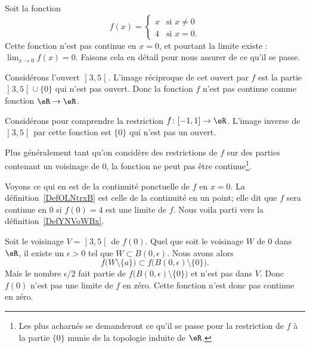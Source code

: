 \begin{example}     \label{EXooKREUooLeuIlv}
    Soit la fonction
    \begin{equation}        \label{EQooSYSWooSGsUfR}
        f(x)=\begin{cases}
            x    &   \text{si } x\neq 0\\
            4    &    \text{si } x=0.
        \end{cases}
    \end{equation}
    Cette fonction n'est pas continue en \( x=0\), et pourtant la limite existe : \( \lim_{x\to 0} f(x)=0\). Faisons cela en détail pour nous assurer de ce qu'il se passe.

    Considérons l'ouvert \( \mathopen] 3 , 5 \mathclose[\). L'image réciproque de cet ouvert par \( f\) est la partie \( \mathopen] 3 , 5 \mathclose[\cup\{ 0 \}\) qui n'est pas ouvert. Donc la fonction \( f\) n'est pas continue comme fonction \( \eR\to \eR\).

    Considérons pour comprendre la restriction \( f\colon \mathopen[ -1 , 1 \mathclose]\to \eR\). L'image inverse de \( \mathopen] 3 , 5 \mathclose[\) par cette fonction est \( \{ 0 \}\) qui n'est pas un ouvert.

    Plus généralement tant qu'on considère des restrictions de \( f\) sur des parties contenant un voisinage de \( 0\), la fonction ne peut pas être continue\footnote{Les plus acharnés se demanderont ce qu'il se passe pour la restriction de \( f\) à la partie \( \{ 0 \}\) munie de la topologie induite de $\eR$.}.

    Voyons ce qui en est de la continuité ponctuelle de \( f\) en \( x=0\). La définition~\ref{DefOLNtrxB} est celle de la continuité en un point; elle dit que \( f\) sera continue en \( 0\) si \( f(0)=4\) est une limite de \( f\). Nous voila parti vers la définition~\ref{DefYNVoWBx}.

Soit le voisinage \( V=\mathopen] 3 , 5 \mathclose[\) de \( f(0)\). Quel que soit le voisinage \( W\) de \( 0\) dans \( \eR\), il existe un \( \epsilon>0\) tel que \( W\subset B(0,\epsilon)\). Nous avons alors
    \begin{equation}
        f\big( W\setminus \{ a \} \big)\subset f\big( B(0,\epsilon)\setminus\{ 0 \} \big).
    \end{equation}
    Mais le nombre \( \epsilon/2\) fait partie de \( f\big( B(0,\epsilon)\setminus\{ 0 \} \big)\) et n'est pas dans \( V\). Donc \( f(0)\) n'est pas une limite de \( f\) en zéro. Cette fonction n'est donc pas continue en zéro.
\end{example}

